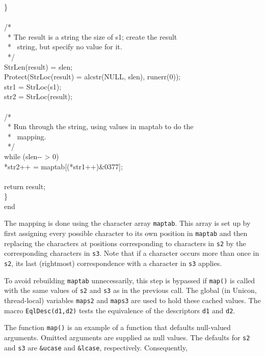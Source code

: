 {\>\>\>\}\\
\\
\>\>\>/*\\
\>\>\>\ * The result is a string the size of s1; create the result\\
\>\>\>\ * \ string, but specify no value for it.\\
\>\>\>\ */\\
\>\>\>StrLen(result) = slen;\\
\>\>\>Protect(StrLoc(result) = alcstr(NULL, slen), runerr(0));\\
\>\>\>str1 = StrLoc(s1);\\
\>\>\>str2 = StrLoc(result);\\
\\
\>\>\>/*\\
\>\>\>\ * Run through the string, using values in maptab to do the\\
\>\>\>\ * \ mapping.\\
\>\>\>\ */\\
\>\>\>while (slen-{}- > 0)\\
\>\>\>\>*str2++ = maptab[(*str1++)\&0377];\\
\\
\>\>\>return result;\\
\>\>\}\\
end
}

The mapping is done using the character array \texttt{maptab}. This
array is set up by first assigning every possible character to its own
position in \texttt{maptab} and then replacing the characters at
positions corresponding to characters in \texttt{s2} by the
corresponding characters in \texttt{s3}. Note that if a character
occurs more than once in \texttt{s2}, its last (rightmost)
correspondence with a character in \texttt{s3} applies.

To avoid rebuilding \texttt{maptab} unnecessarily, this step is
bypassed if \texttt{map()} is called with the same values of
\texttt{s2} and \texttt{s3} as in the previous call. The global
{\color{blue} (in Unicon, thread-local)}
variables \texttt{maps2} and \texttt{maps3} are used to hold these
{\textquotedbl}cached{\textquotedbl} values. The macro
\texttt{EqlDesc(d1,d2)} tests the equivalence of the descriptors
\texttt{d1} and \texttt{d2}.

The function \texttt{map()} is an example of a function that defaults
null-valued arguments. Omitted arguments are supplied as null
values. The defaults for \texttt{s2} and \texttt{s3} are
\texttt{\&ucase} and \texttt{\&lcase}, respectively. Consequently,

